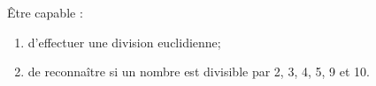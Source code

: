 \begin{myobj}
	Être capable : 
\begin{enumerate}
	\item d'effectuer une division euclidienne;
	\item de reconnaître si un nombre est divisible par 2, 3, 4, 5, 9 et 10.
\end{enumerate}
\end{myobj}